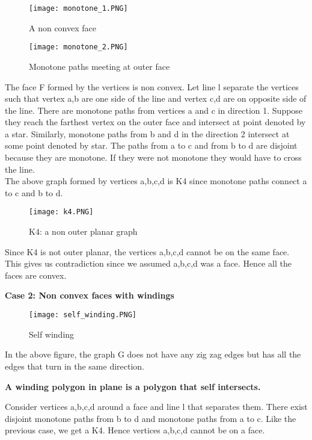 \documentclass{article}
\begin{document}
    
    \begin{figure}[h!]
            \centering
            \texttt{[image: monotone\_1.PNG]}
            \caption{A non convex face}
    \end{figure}
    
    \begin{figure}[h!]
            \centering
            \texttt{[image: monotone\_2.PNG]}
            \caption{Monotone paths meeting at outer face}
    \end{figure}
    
    The face F formed by the vertices is non convex. Let line l separate the vertices such that vertex a,b are one side of the line and vertex c,d are on opposite side of the line. There are monotone paths from vertices a and c in direction 1. Suppose they reach the farthest vertex on the outer face and intersect at point denoted by a star. Similarly, monotone paths from b and d in the direction 2 intersect at some point denoted by star. The paths from a to c and from b to d are disjoint because they are monotone. If they were not monotone they would have to cross the line.\\
    The above graph formed by vertices a,b,c,d is K4 since monotone paths connect a to c and b to d.
    
    \begin{figure}[H]
            \centering
            \texttt{[image: k4.PNG]}
            \caption{K4: a non outer planar graph}
    \end{figure}
    
    Since K4 is not outer planar, the vertices a,b,c,d cannot be on the same face. This gives us contradiction since we assumed a,b,c,d was a face. Hence all the faces are convex. 
    
    \textbf{Case 2: Non convex faces with windings}
    
    
    \begin{figure}[H]
            \centering
            \texttt{[image: self\_winding.PNG]}
            \caption{Self winding}
    \end{figure}
    
    In the above figure, the graph G does not have any zig zag edges but has all the edges that turn in the same direction.
    
    \textbf{A winding polygon in plane is a polygon that self intersects.}
    
    Consider vertices a,b,c,d around a face and line l that separates them.
    There exist disjoint monotone paths from b to d and monotone paths from a to c. Like the previous case, we get a K4. Hence vertices a,b,c,d cannot be on a face.
    
\end{document}
